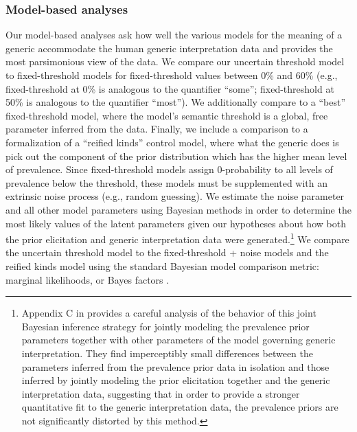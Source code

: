 \documentclass[floatsintext,doc]{apa6}
\let\rmarkdownfootnote\footnote%
\def\footnote{\protect\rmarkdownfootnote}
\newcommand{\ndg}[1]{{\textcolor{Green}{[ndg: #1]}}}
\begin{document}
\hypertarget{model-based-analyses}{%
\subsubsection{Model-based analyses}\label{model-based-analyses}}

Our model-based analyses ask how well the various models for the meaning of a generic accommodate the human generic interpretation data and provides the most parsimonious view of the data.
We compare our uncertain threshold model to fixed-threshold models for fixed-threshold values between 0\% and 60\% (e.g., fixed-threshold at 0\% is analogous to the quantifier ``some''; fixed-threshold at 50\% is analogous to the quantifier ``most''). 
We additionally compare to a ``best'' fixed-threshold model, where the model's semantic threshold is a global, free parameter inferred from the data. 
Finally, we include a comparison to a formalization of a ``reified kinds'' control model, where what the generic does is pick out the component of the prior distribution which has the higher mean level of prevalence. 
Since fixed-threshold models assign 0-probability to all levels of prevalence below the threshold, these models must be supplemented with an extrinsic noise process (e.g., random guessing).
We estimate the noise parameter and all other model parameters using Bayesian methods in order to determine the most likely values of the latent parameters given our hypotheses about how both the prior elicitation and generic interpretation data were generated.\footnote{Appendix C in  provides a careful analysis of the behavior of this joint Bayesian inference strategy for jointly modeling the prevalence prior parameters together with other parameters of the model governing generic interpretation. They find imperceptibly small differences between the parameters inferred from the prevalence prior data in isolation and those inferred by jointly modeling the prior elicitation together and the generic interpretation data, suggesting that in order to provide a stronger quantitative fit to the generic interpretation data, the prevalence priors are not significantly distorted by this method.}
We compare the uncertain threshold model to the fixed-threshold + noise models and the reified kinds model using the standard Bayesian model comparison metric: marginal likelihoods, or Bayes factors \cite{LeeWagenmakers2014}.
\end{document}
